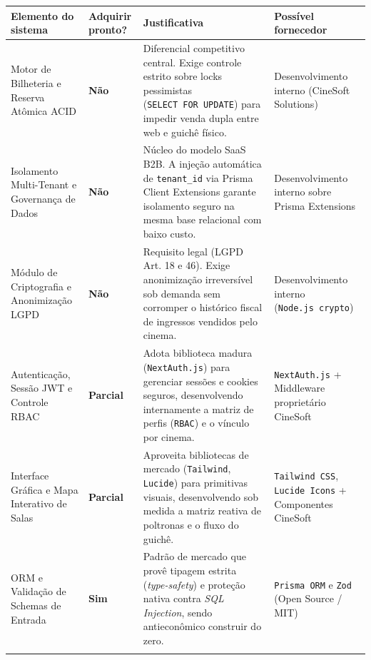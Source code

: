 {\footnotesize
\begin{tabularx}{\textwidth}{>{\fontSemiBold\color{BrandNavy}\hsize\sloppy\arraybackslash}X C{1.69cm} >{\hsize\sloppy\arraybackslash}X >{\hsize\sloppy\arraybackslash}X}
\toprule
{}
\textbf{Elemento do sistema} & \textbf{Adquirir pronto?} & \textbf{Justificativa} & \textbf{Possível fornecedor} \\
\midrule
{}
Motor de Bilheteria e Reserva Atômica ACID & \textbf{Não} & Diferencial competitivo central. Exige controle estrito sobre locks pessimistas (\texttt{SELECT\ FOR\ UPDATE}) para impedir venda dupla entre web e guichê físico. & Desenvolvimento interno (CineSoft Solutions) \\
\midrule
Isolamento Multi-Tenant e Governança de Dados & \textbf{Não} & Núcleo do modelo SaaS B2B. A injeção automática de \texttt{tenant\_id} via Prisma Client Extensions garante isolamento seguro na mesma base relacional com baixo custo. & Desenvolvimento interno sobre Prisma Extensions \\
\midrule
Módulo de Criptografia e Anonimização LGPD & \textbf{Não} & Requisito legal (LGPD Art. 18 e 46). Exige anonimização irreversível sob demanda sem corromper o histórico fiscal de ingressos vendidos pelo cinema. & Desenvolvimento interno (\texttt{Node.js\ crypto}) \\
\midrule
Autenticação, Sessão JWT e Controle RBAC & \textbf{Parcial} & Adota biblioteca madura (\texttt{NextAuth.js}) para gerenciar sessões e cookies seguros, desenvolvendo internamente a matriz de perfis (\texttt{RBAC}) e o vínculo por cinema. & \texttt{NextAuth.js} + Middleware proprietário CineSoft \\
\midrule
Interface Gráfica e Mapa Interativo de Salas & \textbf{Parcial} & Aproveita bibliotecas de mercado (\texttt{Tailwind}, \texttt{Lucide}) para primitivas visuais, desenvolvendo sob medida a matriz reativa de poltronas e o fluxo do guichê. & \texttt{Tailwind\ CSS}, \texttt{Lucide\ Icons} + Componentes CineSoft \\
\midrule
ORM e Validação de Schemas de Entrada & \textbf{Sim} & Padrão de mercado que provê tipagem estrita (\emph{type-safety}) e proteção nativa contra \emph{SQL Injection}, sendo antieconômico construir do zero. & \texttt{Prisma\ ORM} e \texttt{Zod} (Open Source / MIT) \\
\bottomrule
\end{tabularx}%
}
